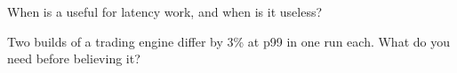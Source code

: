 \begin{interviewq}\label{iq:ll:measuring-latency:5}
When is a  useful for latency work, and when is it useless?
\end{interviewq}

\begin{interviewq}\label{iq:ll:measuring-latency:6}
Two builds of a trading engine differ by 3\% at p99 in one run each. What do you need before believing it?
\end{interviewq}
